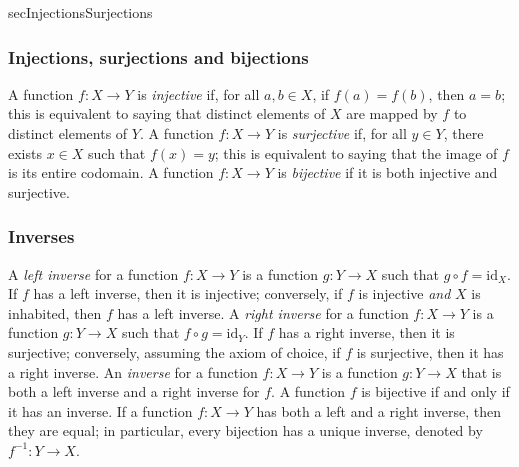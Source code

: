 \begin{tldr}{secInjectionsSurjections}

\subsubsection*{Injections, surjections and bijections}

\begin{tldrlist}
 A function $f : X \to Y$ is \textit{injective} if, for all $a,b \in X$, if $f(a)=f(b)$, then $a=b$; this is equivalent to saying that distinct elements of $X$ are mapped by $f$ to distinct elements of $Y$.
 A function $f : X \to Y$ is \textit{surjective} if, for all $y \in Y$, there exists $x \in X$ such that $f(x)=y$; this is equivalent to saying that the image of $f$ is its entire codomain.
 A function $f : X \to Y$ is \textit{bijective} if it is both injective and surjective.
\end{tldrlist}

\subsubsection*{Inverses}

\begin{tldrlist}
 A \textit{left inverse} for a function $f : X \to Y$ is a function $g : Y \to X$ such that $g \circ f = \mathrm{id}_X$. If $f$ has a left inverse, then it is injective; conversely, if $f$ is injective \textit{and} $X$ is inhabited, then $f$ has a left inverse.
 A \textit{right inverse} for a function $f : X \to Y$ is a function $g : Y \to X$ such that $f \circ g = \mathrm{id}_Y$. If $f$ has a right inverse, then it is surjective; conversely, assuming the axiom of choice, if $f$ is surjective, then it has a right inverse.
 An \textit{inverse} for a function $f : X \to Y$ is a function $g : Y \to X$ that is both a left inverse and a right inverse for $f$. A function $f$ is bijective if and only if it has an inverse.
 If a function $f : X \to Y$ has both a left and a right inverse, then they are equal; in particular, every bijection has a unique inverse, denoted by $f^{-1} : Y \to X$.
\end{tldrlist}

\end{tldr}

